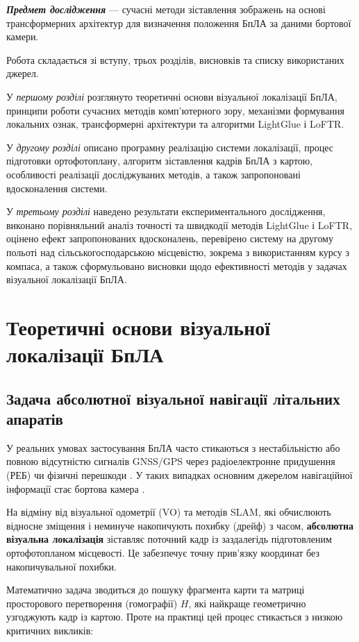 \documentclass[a4paper, 12pt, titlepage]{article}
\begin{document}
\textbf{\textit{Предмет дослідження}} --- сучасні методи зіставлення зображень на основі трансформерних архітектур для визначення положення БпЛА за даними бортової камери.

Робота складається зі вступу, трьох розділів, висновків та списку використаних джерел.

У \textit{першому розділі} розглянуто теоретичні основи візуальної локалізації БпЛА, принципи роботи сучасних методів комп’ютерного зору, механізми формування локальних ознак, трансформерні архітектури та алгоритми LightGlue і LoFTR.

У \textit{другому розділі} описано програмну реалізацію системи локалізації, процес підготовки ортофотоплану, алгоритм зіставлення кадрів БпЛА з картою, особливості реалізації досліджуваних методів, а також запропоновані вдосконалення системи.

У \textit{третьому розділі} наведено результати експериментального дослідження, виконано порівняльний аналіз точності та швидкодії методів LightGlue і LoFTR, оцінено ефект запропонованих вдосконалень, перевірено систему на другому польоті над сільськогосподарською місцевістю, зокрема з використанням курсу з компаса, а також сформульовано висновки щодо ефективності методів у задачах візуальної локалізації БпЛА.


\newpage


\section{Теоретичні основи візуальної локалізації БпЛА}
\subsection{Задача абсолютної візуальної навігації літальних апаратів}

У реальних умовах застосування БпЛА часто стикаються з нестабільністю або повною відсутністю сигналів GNSS/GPS через радіоелектронне придушення (РЕБ) чи фізичні перешкоди \cite{gps}. У таких випадках основним джерелом навігаційної інформації стає бортова камера \cite{visual_nav}.

На відміну від візуальної одометрії (VO) та методів SLAM, які обчислюють відносне зміщення і неминуче накопичують похибку (дрейф) з часом, \textbf{абсолютна візуальна локалізація} зіставляє поточний кадр із заздалегідь підготовленим ортофотопланом місцевості. Це забезпечує точну прив'язку координат без накопичувальної похибки.

Математично задача зводиться до пошуку фрагмента карти та матриці просторового перетворення (гомографії) $H$, які найкраще геометрично узгоджують кадр із картою. Проте на практиці цей процес стикається з низкою критичних викликів:
\end{document}
